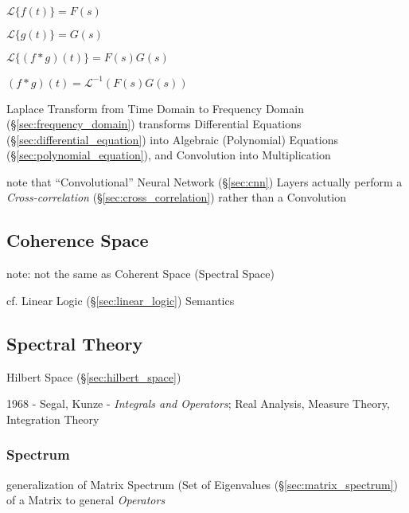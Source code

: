 $\mathcal{L}\{f(t)\} = F(s)$

$\mathcal{L}\{g(t)\} = G(s)$

$\mathcal{L}\{(f * g)(t)\} = F(s)G(s)$

$(f*g)(t) = \mathcal{L}^{-1}(F(s)G(s))$

Laplace Transform from Time Domain to Frequency Domain
(\S\ref{sec:frequency_domain}) transforms Differential Equations
(\S\ref{sec:differential_equation}) into Algebraic (Polynomial) Equations
(\S\ref{sec:polynomial_equation}), and Convolution into Multiplication

\fist note that ``Convolutional'' Neural Network (\S\ref{sec:cnn}) Layers
actually perform a \emph{Cross-correlation} (\S\ref{sec:cross_correlation})
rather than a Convolution



\subsection{Coherence Space}\label{sec:coherence_space}

note: not the same as Coherent Space (Spectral Space)

cf. Linear Logic (\S\ref{sec:linear_logic}) Semantics



\subsection{Spectral Theory}\label{sec:spectral_theory}

Hilbert Space (\S\ref{sec:hilbert_space})

1968 - Segal, Kunze - \emph{Integrals and Operators}; Real Analysis, Measure
Theory, Integration Theory



\subsubsection{Spectrum}\label{sec:spectrum}

generalization of Matrix Spectrum (Set of Eigenvalues
(\S\ref{sec:matrix_spectrum}) of a Matrix to general \emph{Operators}

